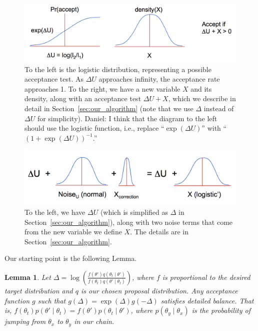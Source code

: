 \documentclass{article}
\newtheorem{lemma}{Lemma}
\begin{document}
\begin{figure}[t]
  \centering
  \includegraphics[width=\textwidth]{john_bair_fig01}
  \caption{
  To the left is the logistic distribution, representing a possible acceptance test. As $\Delta U$
  approaches infinity, the acceptance rate approaches 1. To the right, we have a new variable $X$
  and its density, along with an acceptance test $\Delta U + X$, which we describe in detail in
  Section~\ref{sec:our_algorithm} (note that we use $\Delta$ instead of $\Delta U$ for simplicity).
  {\color{blue}
  Daniel: I think that the diagram to the left should use the logistic function, i.e., replace
  ``$\exp(\Delta U)$'' with ``$(1+\exp(\Delta U))^{-1}$.''
  }
  }
  \label{fig:part1}
\end{figure}

\begin{figure}[t]
  \centering
  \includegraphics[width=\textwidth]{john_bair_fig02}
  \caption{
  To the left, we have $\Delta U$ (which is simplified as $\Delta$ in
  Section~\ref{sec:our_algorithm}), along with two noise terms that come from the new variable we
  define $X$. The details are in Section~\ref{sec:our_algorithm}.
  }
  \label{fig:part2}
\end{figure}

Our starting point is the following Lemma.

\begin{lemma}\label{lem:detailed_balance}
Let $\Delta = \log \left(\frac{f(\theta') q(\theta_t \mid
\theta')}{f(\theta_t) q(\theta'\mid \theta_t)} \right)$, where $f$ is proportional to the desired target distribution and $q$ is our chosen
proposal distribution. Any acceptance function $g$ such that $g(\Delta) = \exp(\Delta) g(-\Delta )$
satisfies detailed balance. That is, $f(\theta_t)p(\theta' \mid \theta_t) = f(\theta')p(\theta_t
\mid \theta')$, where $p(\theta_y \mid \theta_x)$ is the probability of jumping from $\theta_x$ to $\theta_y$ in our chain.
\end{lemma}
\end{document}
